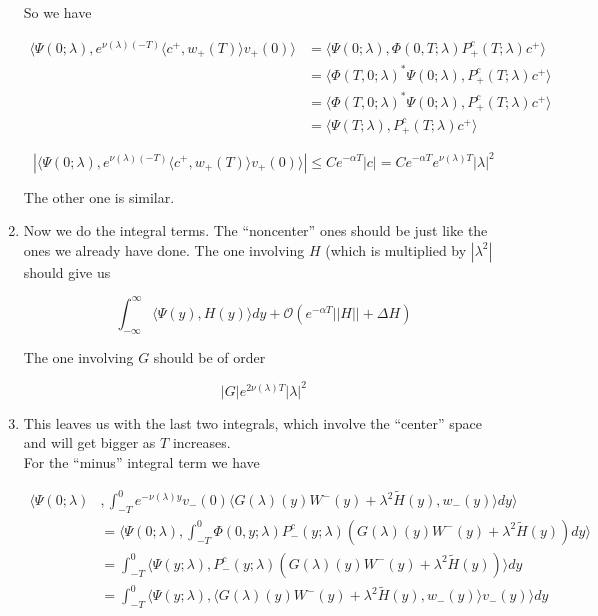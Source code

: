 \documentclass[12pt]{article}
\begin{document}
\begin{enumerate}
So we have

\begin{align*}
\langle \Psi(0; \lambda), e^{\nu(\lambda)(-T)} \langle c^+, w_+(T) \rangle v_+(0) \rangle
&= \langle \Psi(0; \lambda), \Phi(0, T; \lambda) P^c_+(T;\lambda ) c^+ \rangle \\ 
&= \langle \Phi(T, 0; \lambda)^* \Psi(0; \lambda),  P^c_+(T;\lambda ) c^+ \rangle \\
&= \langle \Phi(T, 0; \lambda)^* \Psi(0; \lambda),  P^c_+(T;\lambda ) c^+ \rangle \\
&= \langle \Psi(T; \lambda), P^c_+(T;\lambda ) c^+ \rangle 
\end{align*}

\[
|\langle \Psi(0; \lambda), e^{\nu(\lambda)(-T)} \langle c^+, w_+(T) \rangle v_+(0) \rangle| \leq C e^{-\alpha T} |c| = C e^{-\alpha T} e^{\nu(\lambda)T}|\lambda|^2
\]

The other one is similar.

\item Now we do the integral terms. The ``noncenter'' ones should be just like the ones we already have done. The one involving $H$ (which is multiplied by $|\lambda^2|$ should give us

\[
\int_{-\infty}^\infty \langle \Psi(y), H(y) \rangle dy + \mathcal{O}(e^{-\alpha T}||H|| + \Delta H)
\]

The one involving $G$ should be of order

\[
|G| e^{2 \nu(\lambda)T}|\lambda|^2
\]

\item This leaves us with the last two integrals, which involve the ``center'' space and will get bigger as $T$ increases.\\

For the ``minus'' integral term we have

\begin{align*}
\langle \Psi(0; \lambda) &, \int_{-T}^0 
e^{-\nu(\lambda)y} v_-(0) \langle G(\lambda)(y)W^-(y) + \lambda^2 \tilde{H}(y), w_-(y) \rangle dy \rangle \\
&= \langle \Psi(0; \lambda) , \int_{-T}^0 
\Phi(0, y; \lambda) P^c_-(y;\lambda ) ( G(\lambda)(y)W^-(y) + \lambda^2 \tilde{H}(y)) dy \rangle \\
&= \int_{-T}^0 
\langle \Psi(y; \lambda), P^c_-(y;\lambda ) ( G(\lambda)(y)W^-(y) + \lambda^2 \tilde{H}(y))  \rangle dy  \\
&= \int_{-T}^0 
\langle \Psi(y; \lambda), \langle G(\lambda)(y)W^-(y) + \lambda^2 \tilde{H}(y), w_-(y) \rangle v_-(y) \rangle dy  \\
\end{align*}


\end{enumerate}
\end{document}
